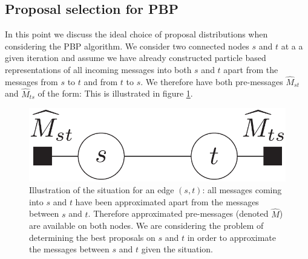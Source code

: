\subsection{Proposal selection for PBP}
In this point we discuss the ideal choice of proposal distributions when considering the PBP algorithm. We consider two connected nodes $s$ and $t$ at a a given iteration and assume we have already constructed particle based representations of all incoming messages into both $s$ and $t$ apart from the messages from $s$ to $t$ and from $t$ to $s$. 
We therefore have both pre-messages $\widehat M_{st}$ and $\widehat M_{ts}$ of the form:
%
%
This is illustrated in figure \ref{representation-edge-pbp}. 

\begin{figure}[!h]
\center
\includegraphics[width=.4\textwidth]{figures/general/belief-st}
\caption{\label{representation-edge-pbp}Illustration of the situation for an edge $(s,t)$: all messages coming into $s$ and $t$ have been approximated apart from the messages between $s$ and $t$. Therefore approximated pre-messages (denoted $\widehat M$) are available on both nodes. We are considering the problem of determining the best proposals on $s$ and $t$ in order to approximate the messages between $s$ and $t$ given the situation.}
\end{figure}


